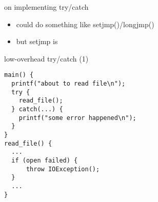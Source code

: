 \usetikzlibrary{shapes.callouts,positioning,calc}

\begin{frame}{on implementing try/catch}
\begin{itemize}
\item could do something like setjmp()/longjmp()
\item but setjmp is 
\end{itemize}
\end{frame}

\begin{frame}[fragile,label=lowOverTryCatch1]{low-overhead try/catch (1)}
\lstset{language=C,style=small}
\begin{lstlisting}
main() {
  printf("about to read file\n");
  try {
    read_file();
  } catch(...) {
    printf("some error happened\n");
  }
}
read_file() {
  ...
  if (open failed) {
      throw IOException();
  }
  ...
}
\end{lstlisting}
\end{frame}

